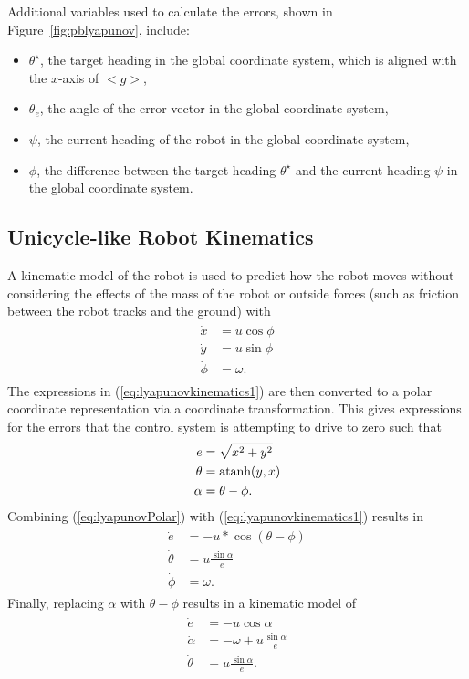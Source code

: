Additional variables used to calculate the errors, shown in Figure~\ref{fig:pblyapunov}, include:
\begin{itemize}
\item $\theta^\star$, the target heading in the global coordinate system, which is aligned with the $x$-axis of $<g>$,
\item $\theta_e$, the angle of the error vector in the global coordinate system,
\item $\psi$, the current heading of the robot in the global coordinate system,
\item $\phi$, the difference between the target heading $\theta^\star$ and the current heading $\psi$ in the global coordinate system.
\end{itemize}

\subsection{Unicycle-like Robot Kinematics}%
\label{sec:unicycleKinematics}
A kinematic model of the robot is used to predict how the robot moves without considering the effects of the mass of the robot or outside forces (such as friction between the robot tracks and the ground) with
\begin{align}
\label{eq:lyapunovkinematics1}
\begin{split}
\dot{x} &= u\cos\phi \\
\dot{y} &= u\sin\phi \\
\dot{\phi} &= \omega.
\end{split}
\end{align}
The expressions in (\ref{eq:lyapunovkinematics1}) are then converted to a polar coordinate representation via a coordinate transformation. This gives expressions for the errors that the control system is attempting to drive to zero such that
\begin{align}
\label{eq:lyapunovPolar}
\begin{split}
e &= \sqrt{x^2+y^2} \\
\theta &= \mathop{\text{atanh}}(y,x) \\
\alpha &= \theta - \phi.
\end{split}
\end{align}
Combining (\ref{eq:lyapunovPolar}) with (\ref{eq:lyapunovkinematics1}) results in
\begin{align*}
\begin{split}
\dot{e} &= -u*\cos(\theta-\phi) \\
\dot{\theta} &= u\frac{\sin\alpha}{e} \\
\dot{\phi} &= \omega.
\end{split}
\end{align*}
Finally, replacing $\alpha$ with $\theta-\phi$ results in a kinematic model of
\begin{align}
\label{eq:lyapunovkinematics}
\begin{split}
\dot{e} &= -u\cos\alpha \\
\dot{\alpha} &= -\omega + u\frac{\sin\alpha}{e} \\
\dot{\theta} &= u\frac{\sin\alpha}{e}.
\end{split}
\end{align}

